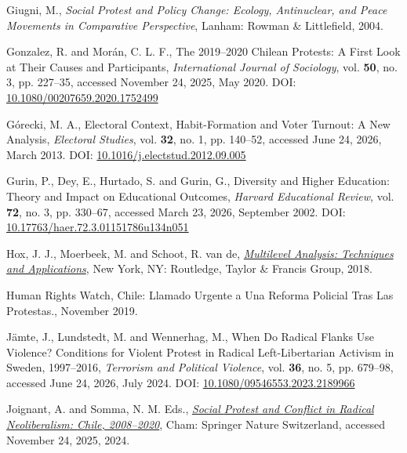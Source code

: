 \documentclass[
  13pt,
]{article}
\newlength{\cslhangindent}
\newenvironment{CSLReferences}[2] %
 {\begin{list}{}{%
  \setlength{\itemindent}{0pt}
  \setlength{\leftmargin}{0pt}
  \setlength{\parsep}{0pt}
  \ifodd #1
   \setlength{\leftmargin}{\cslhangindent}
   \setlength{\itemindent}{-1\cslhangindent}
  \fi
  \setlength{\itemsep}{#2\baselineskip}}}
 {\end{list}}
\begin{document}
\begin{CSLReferences}{1}{0}
Giugni, M., \emph{Social Protest and Policy Change: Ecology,
Antinuclear, and Peace Movements in Comparative Perspective}, Lanham:
Rowman \& Littlefield, 2004.

Gonzalez, R. and Morán, C. L. F., The 2019--2020 {Chilean} Protests: {A}
First Look at Their Causes and Participants, \emph{International Journal
of Sociology}, vol. \textbf{50}, no. 3, pp. 227--35, accessed November
24, 2025, May 2020. DOI:
\href{https://doi.org/10.1080/00207659.2020.1752499}{10.1080/00207659.2020.1752499}

Górecki, M. A., Electoral Context, Habit-Formation and Voter Turnout:
{A} New Analysis, \emph{Electoral Studies}, vol. \textbf{32}, no. 1, pp.
140--52, accessed June 24, 2026, March 2013. DOI:
\href{https://doi.org/10.1016/j.electstud.2012.09.005}{10.1016/j.electstud.2012.09.005}

Gurin, P., Dey, E., Hurtado, S. and Gurin, G., Diversity and {Higher
Education}: {Theory} and {Impact} on {Educational Outcomes},
\emph{Harvard Educational Review}, vol. \textbf{72}, no. 3, pp. 330--67,
accessed March 23, 2026, September 2002. DOI:
\href{https://doi.org/10.17763/haer.72.3.01151786u134n051}{10.17763/haer.72.3.01151786u134n051}

Hox, J. J., Moerbeek, M. and Schoot, R. van de,
\emph{\href{https://doi.org/10.4324/9781315650982}{Multilevel Analysis:
Techniques and Applications}}, New York, NY: Routledge, Taylor \&
Francis Group, 2018.

Human Rights Watch, Chile: {Llamado} Urgente a Una Reforma Policial Tras
Las Protestas., November 2019.

Jämte, J., Lundstedt, M. and Wennerhag, M., When {Do Radical Flanks Use
Violence}? {Conditions} for {Violent Protest} in {Radical
Left-Libertarian Activism} in {Sweden}, 1997--2016, \emph{Terrorism and
Political Violence}, vol. \textbf{36}, no. 5, pp. 679--98, accessed June
24, 2026, July 2024. DOI:
\href{https://doi.org/10.1080/09546553.2023.2189966}{10.1080/09546553.2023.2189966}

Joignant, A. and Somma, N. M. Eds.,
\emph{\href{https://doi.org/10.1007/978-3-031-58132-8}{Social {Protest}
and {Conflict} in {Radical Neoliberalism}: {Chile}, 2008--2020}}, Cham:
Springer Nature Switzerland, accessed November 24, 2025, 2024.


\end{CSLReferences}
\end{document}
